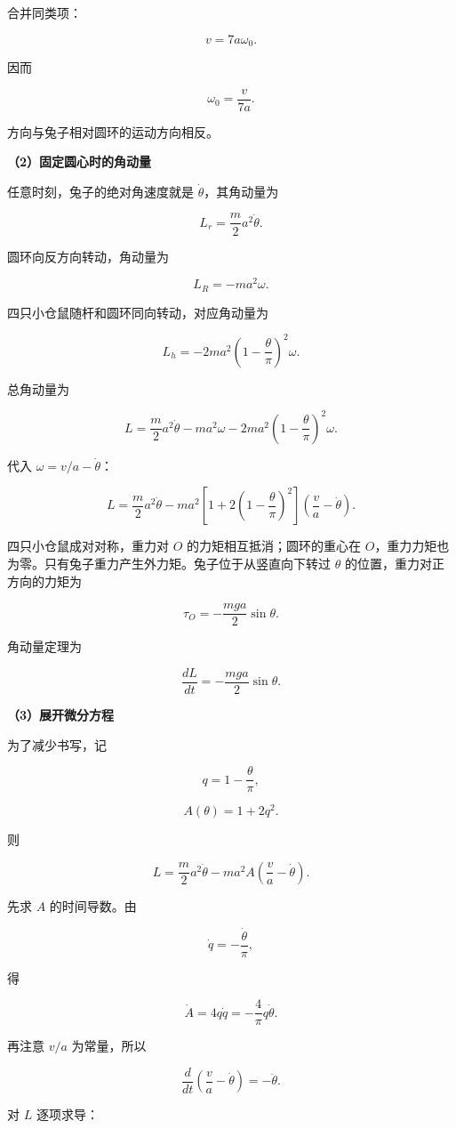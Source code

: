 \documentclass[12pt,a4paper,UTF8]{ctexart}
\begin{document}
合并同类项：

\[v=7a\omega_0.\]

因而

\[\boxed{\omega_0=\frac{v}{7a}}.\]

方向与兔子相对圆环的运动方向相反。

\textbf{（2）固定圆心时的角动量}

任意时刻，兔子的绝对角速度就是 \(\dot\theta\)，其角动量为

\[L_r=\frac m2a^2\dot\theta.\]

圆环向反方向转动，角动量为

\[L_R=-ma^2\omega.\]

四只小仓鼠随杆和圆环同向转动，对应角动量为

\[L_h=-2ma^2\left(1-\frac\theta\pi\right)^2\omega.\]

总角动量为

\[L=\frac m2a^2\dot\theta
-ma^2\omega
-2ma^2\left(1-\frac\theta\pi\right)^2\omega.\]

代入 \(\omega=v/a-\dot\theta\)：

\[L=\frac m2a^2\dot\theta
-ma^2\left[1+2\left(1-\frac\theta\pi\right)^2\right]
\left(\frac va-\dot\theta\right).\]

四只小仓鼠成对对称，重力对 \(O\) 的力矩相互抵消；圆环的重心在
\(O\)，重力力矩也为零。只有兔子重力产生外力矩。兔子位于从竖直向下转过
\(\theta\) 的位置，重力对正方向的力矩为

\[\tau_O=-\frac{mga}{2}\sin\theta.\]

角动量定理为

\[\frac{dL}{dt}=-\frac{mga}{2}\sin\theta.\]

\textbf{（3）展开微分方程}

为了减少书写，记

\[q=1-\frac\theta\pi,\]

\[A(\theta)=1+2q^2.\]

则

\[L=\frac m2a^2\dot\theta-ma^2A
\left(\frac va-\dot\theta\right).\]

先求 \(A\) 的时间导数。由

\[\dot q=-\frac{\dot\theta}{\pi},\]

得

\[\dot A=4q\dot q
=-\frac4\pi q\dot\theta.\]

再注意 \(v/a\) 为常量，所以

\[\frac d{dt}\left(\frac va-\dot\theta\right)=-\ddot\theta.\]

对 \(L\) 逐项求导：
\end{document}
